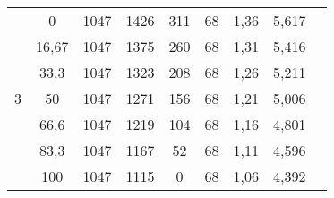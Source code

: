 \begin{adjustbox}{angle=90}
\begin{table}[htbp]
\begin{tabular}{ccccccccc}
	    \multirow{7}[14]{*}{3} & 0     & 1047  & 1426  & 311   & 68    & 1,36  & 5,617 &  \\
	          & 16,67 & 1047  & 1375  & 260   & 68    & 1,31  & 5,416 &  \\
	          & 33,3  & 1047  & 1323  & 208   & 68    & 1,26  & 5,211 &  \\
	          & 50    & 1047  & 1271  & 156   & 68    & 1,21  & 5,006 &  \\
	          & 66,6  & 1047  & 1219  & 104   & 68    & 1,16  & 4,801 &  \\
	          & 83,3  & 1047  & 1167  & 52    & 68    & 1,11  & 4,596 &  \\
	          & 100   & 1047  & 1115  & 0     & 68    & 1,06  & 4,392 &  \\
	    \bottomrule
	    \end{tabular}%
	  \label{tab:addlabel}%
	\end{table}%
\end{adjustbox}